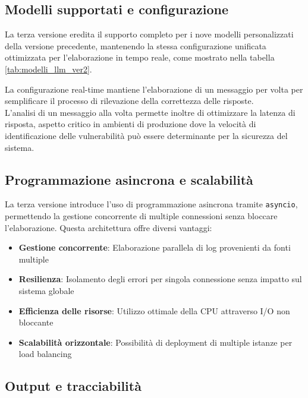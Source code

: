 \documentclass[12pt]{report}
\begin{document}
\subsection{Modelli supportati e configurazione}
\label{subsec:ver3_modelli_supportati}

La terza versione eredita il supporto completo per i nove modelli personalizzati della versione precedente, mantenendo la stessa configurazione unificata ottimizzata per l'elaborazione in tempo reale, come mostrato nella tabella \ref{tab:modelli_llm_ver2}.

La configurazione real-time mantiene l'elaborazione di un messaggio per volta per semplificare il processo di rilevazione della correttezza delle risposte. \\
L'analisi di un messaggio alla volta permette inoltre di ottimizzare la latenza di risposta, aspetto critico in ambienti di produzione dove la velocità di identificazione delle vulnerabilità può essere determinante per la sicurezza del sistema.

\subsection{Programmazione asincrona e scalabilità}
\label{subsec:ver3_asincrona}

La terza versione introduce l'uso di programmazione asincrona tramite \texttt{asyncio}, permettendo la gestione concorrente di multiple connessioni senza bloccare l'elaborazione. Questa architettura offre diversi vantaggi:

\begin{itemize}
    \item \textbf{Gestione concorrente}: Elaborazione parallela di log provenienti da fonti multiple
    \item \textbf{Resilienza}: Isolamento degli errori per singola connessione senza impatto sul sistema globale
    \item \textbf{Efficienza delle risorse}: Utilizzo ottimale della CPU attraverso I/O non bloccante
    \item \textbf{Scalabilità orizzontale}: Possibilità di deployment di multiple istanze per load balancing
\end{itemize}

\subsection{Output e tracciabilità}
\label{subsec:ver3_output}
\end{document}
